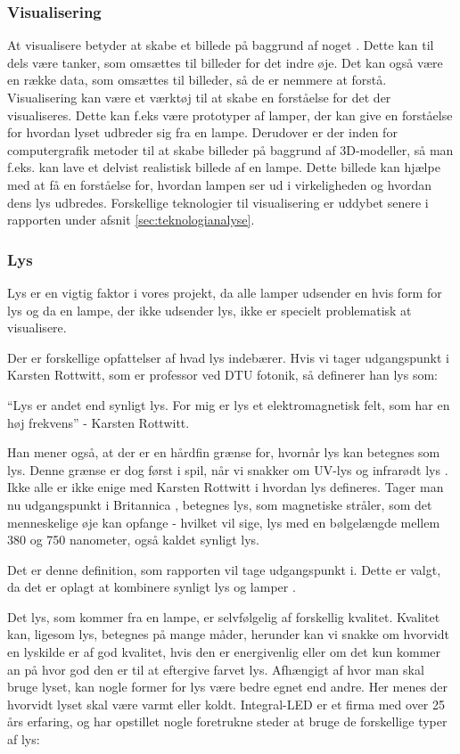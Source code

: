 \subsubsection{Visualisering}
At visualisere betyder at skabe et billede på baggrund af noget \cite{ddo_visualisering}. Dette kan til dels være tanker, som omsættes til billeder for det indre øje. Det kan også være en række data, som omsættes til billeder, så de er nemmere at forstå.
Visualisering kan være et værktøj til at skabe en forståelse for det der visualiseres. Dette kan f.eks være prototyper af lamper, der kan give en forståelse for hvordan lyset udbreder sig fra en lampe. Derudover er der inden for computergrafik metoder til at skabe billeder på baggrund af 3D-modeller, så man f.eks. kan lave et delvist realistisk billede af en lampe. Dette billede kan hjælpe med at få en forståelse for, hvordan lampen ser ud i virkeligheden og hvordan dens lys udbredes. Forskellige teknologier til visualisering er uddybet senere i rapporten under afsnit \ref{sec:teknologianalyse}. 

\subsubsection{Lys}
Lys er en vigtig faktor i vores projekt, da alle lamper udsender en hvis form for lys og da en lampe, der ikke udsender lys, ikke er specielt problematisk at visualisere.


Der er forskellige opfattelser af hvad lys indebærer. Hvis vi tager udgangspunkt i Karsten Rottwitt, som er professor ved DTU fotonik, så definerer han lys som:

“Lys er andet end synligt lys. For mig er lys et elektromagnetisk felt, som har en høj frekvens”
- Karsten Rottwitt\cite{def_lys}.

Han mener også, at der er en hårdfin grænse for, hvornår lys kan betegnes som lys. Denne grænse er dog først i spil, når vi snakker om UV-lys og infrarødt lys \cite{def_lys}. 
Ikke alle er ikke enige med Karsten Rottwitt i hvordan lys defineres. Tager man nu udgangspunkt i Britannica \cite{britannica_lys}, betegnes lys, som magnetiske stråler, som det menneskelige øje kan opfange - hvilket vil sige, lys med en bølgelængde mellem 380 og 750 nanometer, også kaldet synligt lys. 

Det er denne definition, som rapporten vil tage udgangspunkt i. Dette er valgt, da det er oplagt at kombinere synligt lys og lamper \cite{def_lys}.

Det lys, som kommer fra en lampe, er selvfølgelig af forskellig kvalitet. Kvalitet kan, ligesom lys, betegnes på mange måder, herunder kan vi snakke om hvorvidt en lyskilde er af god kvalitet, hvis den er energivenlig eller om det kun kommer an på hvor god den er til at eftergive farvet lys. 
Afhængigt af hvor man skal bruge lyset, kan nogle former for lys være bedre egnet end andre. Her menes der hvorvidt lyset skal være varmt eller koldt. Integral-LED er et firma med over 25 års erfaring\cite{integral_led}, og har opstillet nogle foretrukne steder at bruge de forskellige typer af lys:


